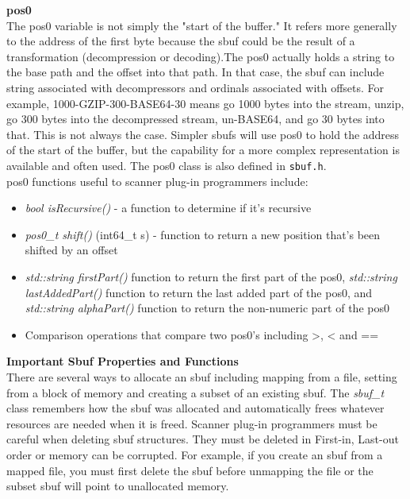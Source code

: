 \documentclass[11pt,fleqn]{article} %
\begin{document}
\textbf{pos0} \\
The pos0 variable is not simply the "start of the buffer." It refers more generally to the address of the first byte because the sbuf could be the result of a transformation (decompression or decoding).The pos0 actually holds a string to the base path and the offset into that path.  In that case, the sbuf can include string associated with decompressors and ordinals associated with offsets. For example, 1000-GZIP-300-BASE64-30 means go 1000 bytes into the stream, unzip, go 300 bytes into the decompressed stream, un-BASE64, and go 30 bytes into that. This is not always the case. Simpler sbufs will use pos0 to hold the address of the start of the buffer, but the capability for a more complex representation is available and often used. The pos0 class is also defined in \texttt{sbuf.h}.\\

pos0 functions useful to scanner plug-in programmers include:
\begin{itemize}
\item \textit{bool isRecursive()} - a function to determine if it's recursive
\item \textit{pos0\_t shift()} (int64\_t s) - function to return a new position that's been shifted by an offset
\item \textit{std::string firstPart()} function to return the first part of the pos0, \textit{std::string lastAddedPart()} function to return the last added part of the pos0, and \textit{std::string alphaPart()} function to return the non-numeric part of the pos0 
\item Comparison operations that compare two pos0's including >, < and ==
\end{itemize}

\textbf{Important Sbuf Properties and Functions} \\
There are several ways to allocate an sbuf including mapping from a file, setting from a block of memory and creating a subset of an existing sbuf. The \textit{sbuf\_t} class remembers how the sbuf was allocated and automatically frees whatever resources are needed when it is freed. Scanner plug-in programmers must be careful when deleting sbuf structures. They must be deleted in First-in, Last-out order or memory can be corrupted. For example, if you create an sbuf from a mapped file, you must first delete the sbuf before unmapping the file or the subset sbuf will point to unallocated memory. \\
\end{document}
